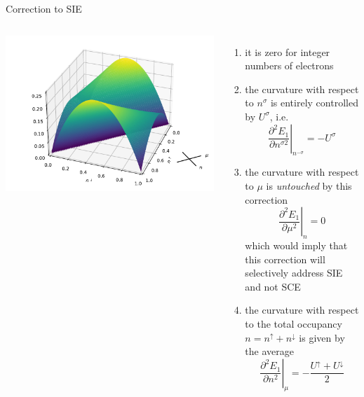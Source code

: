 \documentclass[xcolor=table,aspectratio=169]{beamer}
\numberwithin{equation}{section}
\begin{document}
\begin{frame}{Correction to SIE}
    \begin{columns}
        \centering
        \includegraphics[width=1\columnwidth]{figures/novel_u_correction.pdf}
        \footnotesize
        \begin{enumerate}
            \item it is zero for integer numbers of electrons
            \item the curvature with respect to $n^\sigma$ is entirely controlled by $U^\sigma$, i.e.
                  \begin{equation}
                      \left.\frac{\partial^2 E_1}{\partial n^{\sigma 2}}\right|_{n^{-\sigma}} = - U^\sigma
                  \end{equation}
            \item the curvature with respect to $\mu$ is \emph{untouched} by this correction
                  \begin{equation}
                      \left.\frac{\partial^2 E_1}{\partial \mu^{2}}\right|_{n} = 0
                  \end{equation}
                  which would imply that this correction will selectively address SIE and not SCE
            \item the curvature with respect to the total occupancy $n = n^\uparrow + n^\downarrow$ is given by the average
                  \begin{equation}
                      \left.\frac{\partial^2 E_1}{\partial n^{2}}\right|_{\mu} = -\frac{U^\uparrow + U^\downarrow}{2}
                  \end{equation}
        \end{enumerate}
    \end{columns}
\end{frame}
\end{document}
